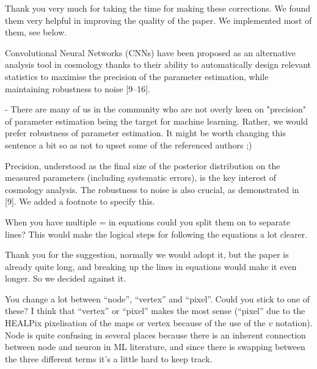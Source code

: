 \documentclass[12pt,a4paper]{article}
\newcommand{\TK}[1]{{\color{red}{TK: #1}}}
\newcommand{\1}{\b{1}}              %
\newcommand{\0}{\b{0}}              %
\begin{document}
Thank you very much for taking the time for making these corrections.
We found them very helpful in improving the quality of the paper.
We implemented most of them, see below.

\begin{mdframed}[style=comment]
Convolutional Neural Networks (CNNs) have been proposed as an alternative analysis tool in cosmology thanks to their ability to automatically design relevant statistics to maximise the precision of the parameter estimation, while maintaining robustness to noise [9–16].

- There are many of us in the community who are not overly keen on "precision" of parameter estimation being the target for machine learning. Rather, we would prefer robustness of parameter estimation. It might be worth changing this sentence a bit so as not to upset some of the referenced authors ;)
\end{mdframed}

Precision, understood as the final size of the posterior distribution on the measured parameters (including systematic errors), is the key interest of cosmology analysis.
The robustness to noise is also crucial, as demonstrated in [9].
We added a footnote to specify this.

\begin{mdframed}[style=comment]
When you have multiple = in equations could you split them on to separate lines? This would make the logical steps for following the equations a lot clearer.
\end{mdframed}

Thank you for the suggestion, normally we would adopt it, but the paper is already quite long, and breaking up the lines in equations would make it even longer. So we decided against it.

\begin{mdframed}[style=comment]
You change a lot between ``node'', ``vertex'' and ``pixel''. Could you stick to one of these? I think that ``vertex'' or ``pixel'' makes the most sense (``pixel'' due to the HEALPix pixelisation of the maps or vertex because of the use of the $v$ notation). Node is quite confusing in several places because there is an inherent connection between node and neuron in ML literature, and since there is swapping between the three different terms it's a little hard to keep track.
\end{mdframed}
\end{document}
